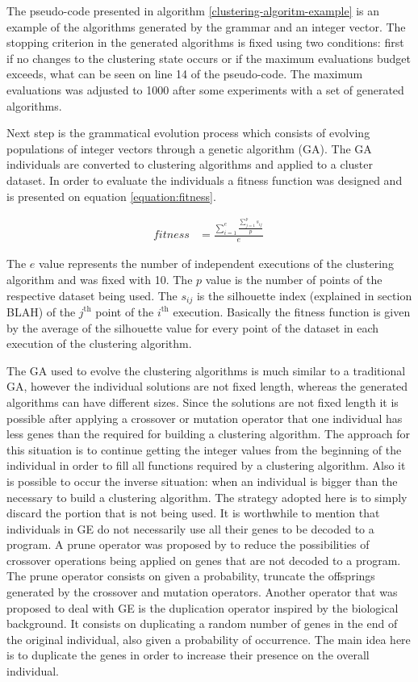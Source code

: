 \documentclass[journal]{IEEEtran}
\begin{document}
The pseudo-code presented in algorithm \ref{clustering-algoritm-example} is an example of the algorithms generated by the grammar and an integer vector. The stopping criterion in the generated algorithms is fixed using two conditions: first if no changes to the clustering state occurs or if the maximum evaluations budget exceeds, what can be seen on line 14 of the pseudo-code. The maximum evaluations was adjusted to 1000 after some experiments with a set of generated algorithms.


Next step is the grammatical evolution process which consists of evolving populations of integer vectors through a genetic algorithm (GA). The GA individuals are converted to clustering algorithms and applied to a cluster dataset. In order to evaluate the individuals a fitness function  was designed and is presented on equation \ref{equation:fitness}.

\begin{align}
	\label{equation:fitness}
	fitness    &= \frac{\sum_{i=1}^e \frac{\sum_{j=1}^{p} s_{ij}}{p}}{e}
	\
\end{align}

The $e$ value represents the number of independent executions of the clustering algorithm and was fixed with 10. The $p$ value is the number of points of the respective dataset being used. The $s_{ij}$ is the silhouette index (explained in section BLAH) of the $j^{\text{th}}$ point of the $i^{\text{th}}$ execution. Basically the fitness function is given by the average of the silhouette value for every point of the dataset in each execution of the clustering algorithm.

The GA used to evolve the clustering algorithms is much similar to a traditional GA, however the individual solutions are not fixed length, whereas the generated algorithms can have different sizes. Since the solutions are not fixed length it is possible after applying a crossover or mutation operator that one individual has less genes than the required for building a clustering algorithm. The approach for this situation is to continue getting the integer values from the beginning of the individual in order to fill all functions required by a clustering algorithm. Also it is possible to occur the inverse situation: when an individual is bigger than the necessary to build a clustering algorithm. The strategy adopted here is to simply discard the portion that is not being used. It is worthwhile to mention that individuals in GE do not necessarily use all their genes to be decoded to a program. A prune operator was proposed by \cite{ryan1998grammatical} to reduce the possibilities of crossover operations being applied on genes that are not decoded to a program. The prune operator consists on given a probability, truncate the offsprings generated by the crossover and mutation operators. Another operator that was proposed to deal with GE is the duplication operator inspired by the biological background. It consists on duplicating a random number of genes in the end of the original individual, also given a probability of occurrence. The main idea here is to duplicate the genes in order to increase their presence on the overall individual.
\end{document}
